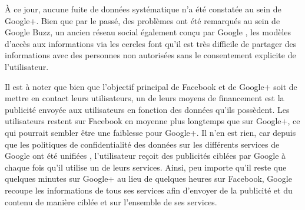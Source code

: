 
À ce jour, aucune fuite de données systématique n'a été constatée au sein de
Google+. Bien que par le passé, des problèmes ont été remarqués au sein de
Google Buzz, un ancien réseau social également conçu par Google
\cite{buzz-fail}, les modèles d'accès aux informations via les cercles font
qu'il est très difficile de partager des informations avec des personnes non
autorisées sans le consentement explicite de l'utilisateur.


Il est à noter que bien que l'objectif principal de Facebook et de Google+ soit
de mettre en contact leurs utilisateurs, un de leurs moyens de financement est
la publicité envoyée aux utilisateurs en fonction des données qu'ils possèdent.
Les utilisateurs restent sur Facebook en moyenne plus longtemps que sur
Google+, ce qui pourrait sembler être une faiblesse pour Google+. Il n'en est
rien, car depuis que les politiques de confidentialité des données sur les
différents services de Google ont été unifiées \cite{spyw}, l'utilisateur
reçoit des publicités ciblées par Google à chaque fois qu'il utilise un de
leurs services. Ainsi, peu importe qu'il reste que quelques minutes sur Google+
au lieu de quelques heures sur Facebook, Google recoupe les informations de
tous ses services afin d'envoyer de la publicité et du contenu de manière
ciblée et sur l'ensemble de ses services.
